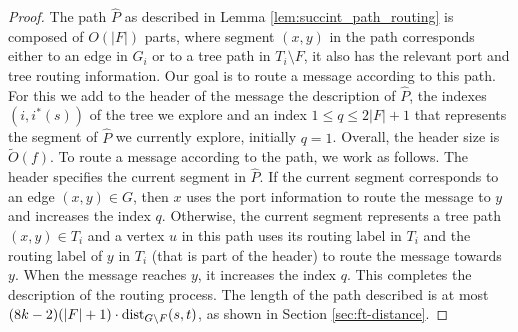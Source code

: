 \begin{proof}
The path $\widehat{P}$ as described in Lemma \ref{lem:succint_path_routing} is composed of $O(|F|)$ parts, where segment $(x,y)$ in the path corresponds either to an edge in $G_i$ or to a tree path in $T_i \setminus F$, it also has the relevant port and tree routing information. Our goal is to route a message according to this path. For this we add to the header of the message the description of $\widehat{P}$, the indexes $(i,i^*(s))$ of the tree we explore and an index $1 \leq q \leq 2|F|+1$ that represents the segment of $\widehat{P}$ we currently explore, initially $q=1$. Overall, the header size is $\widetilde{O}(f)$. To route a message according to the path, we work as follows. The header specifies the current segment in $\widehat{P}$. If the current segment corresponds to an edge $(x,y) \in G$, then $x$ uses the port information to route the message to $y$ and increases the index $q$. Otherwise, the current segment represents a tree path $(x,y) \in T_i$ and a vertex $u$ in this path uses its routing label in $T_i$ and the routing label of $y$ in $T_i$ (that is part of the header) to route the message towards $y$. When the message reaches $y$, it increases the index $q$. This completes the description of the routing process. The length of the path described is at most $(8k-2)(|F|+1)\cdot \mbox{\rm dist}_{G\setminus F}(s,t)$, as shown in Section  \ref{sec:ft-distance}. 
\end{proof}



